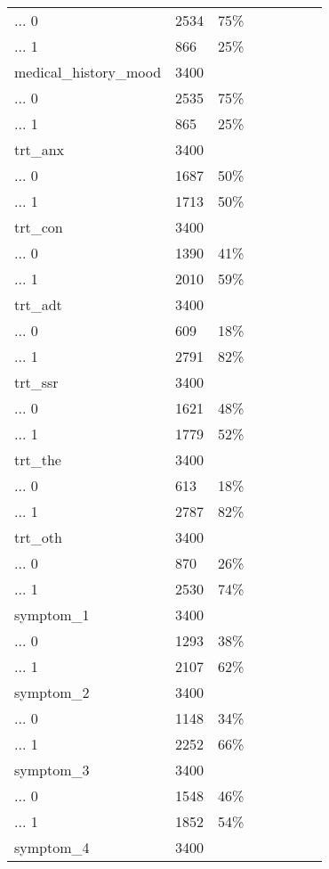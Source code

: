 \documentclass[
]{article}
\begin{document}
\begin{table}
\begin{tabular}[t]{llllllll}
... 0 & 2534 & 75\% &  &  &  &  & \\
\addlinespace
... 1 & 866 & 25\% &  &  &  &  & \\
medical\_history\_mood & 3400 &  &  &  &  &  & \\
... 0 & 2535 & 75\% &  &  &  &  & \\
... 1 & 865 & 25\% &  &  &  &  & \\
trt\_anx & 3400 &  &  &  &  &  & \\
\addlinespace
... 0 & 1687 & 50\% &  &  &  &  & \\
... 1 & 1713 & 50\% &  &  &  &  & \\
trt\_con & 3400 &  &  &  &  &  & \\
... 0 & 1390 & 41\% &  &  &  &  & \\
... 1 & 2010 & 59\% &  &  &  &  & \\
\addlinespace
trt\_adt & 3400 &  &  &  &  &  & \\
... 0 & 609 & 18\% &  &  &  &  & \\
... 1 & 2791 & 82\% &  &  &  &  & \\
trt\_ssr & 3400 &  &  &  &  &  & \\
... 0 & 1621 & 48\% &  &  &  &  & \\
\addlinespace
... 1 & 1779 & 52\% &  &  &  &  & \\
trt\_the & 3400 &  &  &  &  &  & \\
... 0 & 613 & 18\% &  &  &  &  & \\
... 1 & 2787 & 82\% &  &  &  &  & \\
trt\_oth & 3400 &  &  &  &  &  & \\
\addlinespace
... 0 & 870 & 26\% &  &  &  &  & \\
... 1 & 2530 & 74\% &  &  &  &  & \\
symptom\_1 & 3400 &  &  &  &  &  & \\
... 0 & 1293 & 38\% &  &  &  &  & \\
... 1 & 2107 & 62\% &  &  &  &  & \\
\addlinespace
symptom\_2 & 3400 &  &  &  &  &  & \\
... 0 & 1148 & 34\% &  &  &  &  & \\
... 1 & 2252 & 66\% &  &  &  &  & \\
symptom\_3 & 3400 &  &  &  &  &  & \\
... 0 & 1548 & 46\% &  &  &  &  & \\
\addlinespace
... 1 & 1852 & 54\% &  &  &  &  & \\
symptom\_4 & 3400 &  &  &  &  &  & \\

\end{tabular}
\end{table}
\end{document}
